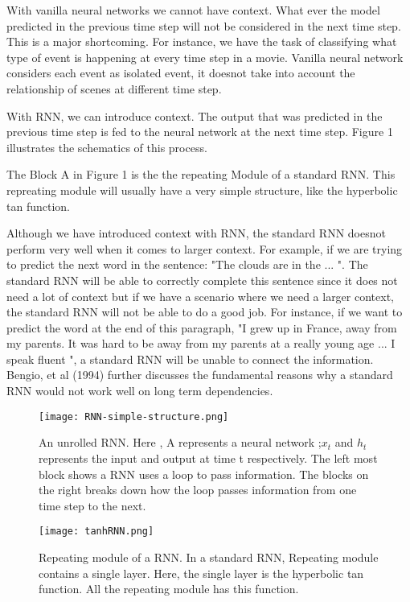 \documentclass[12pt,a4paper]{article}
\numberwithin{equation}{section}
\begin{document}
With vanilla neural networks we cannot have context. What ever the model predicted in the previous time step will not be considered in the next time step. This is a major shortcoming. For instance, we have the task of classifying what type of event is happening at every time step in a movie. Vanilla neural network considers each event as isolated event, it doesnot take into account the relationship of scenes at different time step.

With RNN, we can introduce context. The output that was predicted in the previous time step is fed to the neural network at the next time step. Figure 1 illustrates the schematics of this process.

The Block A in Figure 1 is the the repeating Module of a standard RNN. This repreating module will usually have a very simple structure, like the hyperbolic tan function.

Although we have introduced context with RNN, the standard RNN doesnot perform very well when it comes to larger context. For example, if we are trying to predict the next word in the sentence: "The clouds are in the ... ". The standard RNN will be able to correctly complete this sentence since it does not need a lot of context but if we have a scenario where we need a larger context, the standard RNN will not be able to do a good job. For instance, if we want to predict the word at the end of this paragraph, "I grew up in France, away from my parents. It was hard to be away from my parents at a really young age ... I speak fluent \underline{\hspace{1cm}}", a standard RNN will be unable to connect the information. Bengio, et al (1994) further discusses the fundamental reasons why a standard RNN would not work well on long term dependencies.
\begin{figure}
    \centering
    \texttt{[image: RNN-simple-structure.png]}
    \caption{An unrolled RNN. Here , A represents a neural network ;$x_t$ and $h_t$ represents the input and output at time t respectively. The left most block shows a RNN uses a loop to pass information. The blocks on the right breaks down how the loop passes information from one time step to the next.  }
   
  
 
 
    \label{fig:my_label}
\end{figure}



\begin{figure}
    \centering
    \texttt{[image: tanhRNN.png]}
    \caption{Repeating module of a RNN. In a standard RNN, Repeating module contains a single layer. Here, the single layer is the hyperbolic tan function. All the repeating module has this function.}
   
  
 
 
    \label{fig:my_label}
\end{figure}
\end{document}
